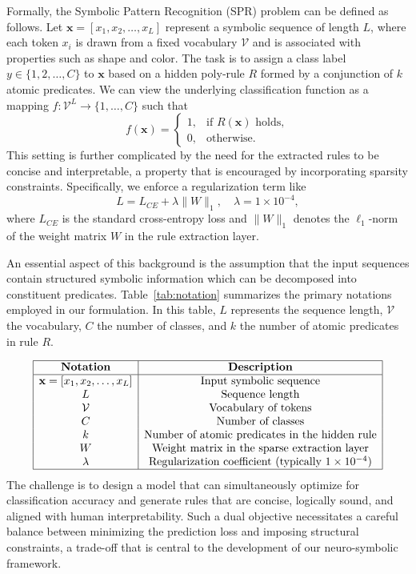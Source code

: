 \documentclass{article}
\begin{document}
Formally, the Symbolic Pattern Recognition (SPR) problem can be defined as follows. Let \( \mathbf{x} = [x_1, x_2, \dots, x_L] \) represent a symbolic sequence of length \( L \), where each token \( x_i \) is drawn from a fixed vocabulary \( \mathcal{V} \) and is associated with properties such as shape and color. The task is to assign a class label \( y \in \{1, 2, \ldots, C\} \) to \( \mathbf{x} \) based on a hidden poly‐rule \( R \) formed by a conjunction of \( k \) atomic predicates. We can view the underlying classification function as a mapping \( f\colon \mathcal{V}^L \to \{1, \dots, C\} \) such that
\[
f(\mathbf{x}) = \begin{cases}
1, & \text{if } R(\mathbf{x}) \text{ holds}, \\
0, & \text{otherwise}.
\end{cases}
\]
This setting is further complicated by the need for the extracted rules to be concise and interpretable, a property that is encouraged by incorporating sparsity constraints. Specifically, we enforce a regularization term like
\[
L = L_{CE} + \lambda \|W\|_1,\quad \lambda=1 \times 10^{-4},
\]
where \( L_{CE} \) is the standard cross-entropy loss and \( \|W\|_1 \) denotes the \(\ell_1\)-norm of the weight matrix \( W \) in the rule extraction layer.

An essential aspect of this background is the assumption that the input sequences contain structured symbolic information which can be decomposed into constituent predicates. Table~\ref{tab:notation} summarizes the primary notations employed in our formulation. In this table, \( L \) represents the sequence length, \( \mathcal{V} \) the vocabulary, \( C \) the number of classes, and \( k \) the number of atomic predicates in rule \( R \).

\[
\begin{array}{|c|c|}
\hline
\textbf{Notation} & \textbf{Description} \\
\hline
\mathbf{x} = [x_1, x_2, \dots, x_L] & \text{Input symbolic sequence} \\
L & \text{Sequence length} \\
\mathcal{V} & \text{Vocabulary of tokens} \\
C & \text{Number of classes} \\
k & \text{Number of atomic predicates in the hidden rule} \\
W & \text{Weight matrix in the sparse extraction layer} \\
\lambda & \text{Regularization coefficient (typically } 1 \times 10^{-4}\text{)} \\
\hline
\end{array}
\]
The challenge is to design a model that can simultaneously optimize for classification accuracy and generate rules that are concise, logically sound, and aligned with human interpretability. Such a dual objective necessitates a careful balance between minimizing the prediction loss and imposing structural constraints, a trade-off that is central to the development of our neuro-symbolic framework.
\end{document}
